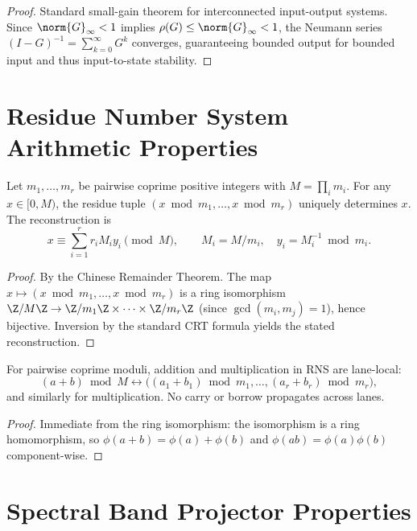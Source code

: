 \documentclass[11pt]{article}
\begin{document}
\begin{proof}
Standard small-gain theorem for interconnected input-output systems.  Since
$\norm{G}_\infty < 1$ implies $\rho(G) \leq \norm{G}_\infty < 1$, the
Neumann series $(I-G)^{-1} = \sum_{k=0}^\infty G^k$ converges, guaranteeing
bounded output for bounded input and thus input-to-state stability.
\end{proof}

\section{Residue Number System Arithmetic Properties}

\begin{theorem}
Let $m_1,\dots,m_r$ be pairwise coprime positive integers with
$M=\prod_i m_i$.  For any $x\in[0,M)$, the residue tuple
$(x\bmod m_1,\dots,x\bmod m_r)$ uniquely determines $x$.
The reconstruction is
\[
  x \equiv \sum_{i=1}^r r_i M_i y_i \pmod{M}, \qquad
  M_i = M/m_i, \quad y_i = M_i^{-1} \bmod m_i.
\]
\end{theorem}

\begin{proof}
By the Chinese Remainder Theorem.  The map
$x\mapsto (x\bmod m_1,\dots,x\bmod m_r)$ is a ring isomorphism
$\Z/M\Z \to \Z/m_1\Z \times\cdots\times\Z/m_r\Z$
(since $\gcd(m_i,m_j)=1$), hence bijective.  Inversion by the standard
CRT formula yields the stated reconstruction.
\end{proof}

\begin{proposition}
For pairwise coprime moduli, addition and multiplication in RNS are
lane-local:
\[
  (a+b)\bmod M \leftrightarrow
  \bigl((a_1+b_1)\bmod m_1,\dots,(a_r+b_r)\bmod m_r\bigr),
\]
and similarly for multiplication.  No carry or borrow propagates across lanes.
\end{proposition}

\begin{proof}
Immediate from the ring isomorphism: the isomorphism is a ring homomorphism,
so $\phi(a+b)=\phi(a)+\phi(b)$ and $\phi(ab)=\phi(a)\phi(b)$ component-wise.
\end{proof}

\section{Spectral Band Projector Properties}
\end{document}
